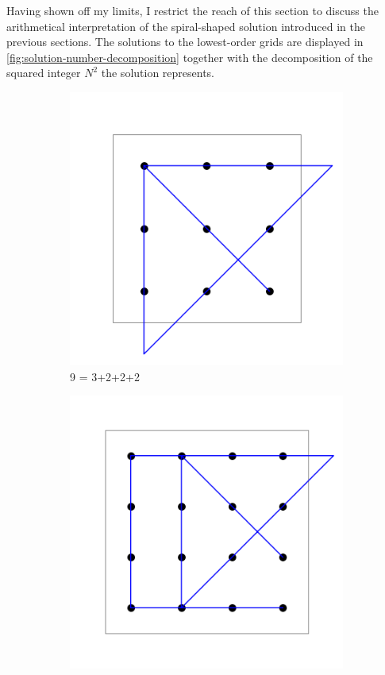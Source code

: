 \documentclass[11pt]{article}
\begin{document}
Having shown off my limits, I restrict the reach of this section to discuss the arithmetical interpretation of the spiral-shaped solution introduced in the previous sections. The solutions to the lowest-order grids are displayed in \autoref{fig:solution-number-decomposition} together with the decomposition of the squared integer $N^2$ the solution represents.
\begin{figure}
\begin{subfigure}[b]{.3\linewidth}
\includegraphics[width=\linewidth]{images/9-dots-solution.png}
\caption{9 = 3+2+2+2}\label{fig-a}
\end{subfigure}
\hfill
\begin{subfigure}[b]{.3\linewidth}
\includegraphics[width=\linewidth]{images/4x4_grid_iteration_solution.png}

\end{subfigure}
\end{figure}
\end{document}
